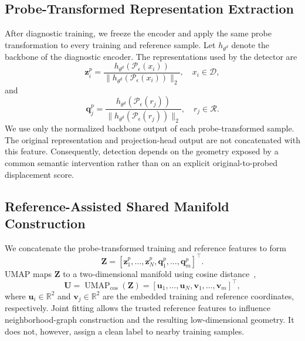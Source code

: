 \documentclass[10pt,journal]{IEEEtran}
\begin{document}
\subsection{Probe-Transformed Representation Extraction}
\label{sec:probe_feature_extraction}

After diagnostic training, we freeze the encoder and apply the same
probe transformation to every training and reference sample. Let
$h_{\theta^{d}}$ denote the backbone of the diagnostic encoder. The
representations used by the detector are
\begin{equation}
    \mathbf{z}_{i}^{p}
    =
    \frac{
        h_{\theta^{d}}(\mathcal{P}_{\epsilon}(x_i))
    }{
        \|h_{\theta^{d}}(\mathcal{P}_{\epsilon}(x_i))\|_2
    },
    \quad x_i\in\mathcal{D},
    \label{eq:training_probe_feature}
\end{equation}
and
\begin{equation}
    \mathbf{q}_{j}^{p}
    =
    \frac{
        h_{\theta^{d}}(\mathcal{P}_{\epsilon}(r_j))
    }{
        \|h_{\theta^{d}}(\mathcal{P}_{\epsilon}(r_j))\|_2
    },
    \quad r_j\in\mathcal{R}.
    \label{eq:reference_probe_feature}
\end{equation}
We use only the normalized backbone output of each probe-transformed
sample. The original representation and projection-head output are not
concatenated with this feature. Consequently, detection depends on the
geometry exposed by a common semantic intervention rather than on an
explicit original-to-probed displacement score.

\subsection{Reference-Assisted Shared Manifold Construction}
\label{sec:shared_manifold}

We concatenate the probe-transformed training and reference features
to form
\begin{equation}
    \mathbf{Z}
    =
    [\mathbf{z}_{1}^{p},\ldots,\mathbf{z}_{N}^{p},
      \mathbf{q}_{1}^{p},\ldots,\mathbf{q}_{m}^{p}]^{\top}.
    \label{eq:joint_feature_matrix}
\end{equation}
UMAP maps $\mathbf{Z}$ to a two-dimensional manifold using cosine
distance~\cite{McInnes2018UMAP},
\begin{equation}
    \mathbf{U}
    =
    \operatorname{UMAP}_{\mathrm{cos}}(\mathbf{Z})
    =
    [\mathbf{u}_{1},\ldots,\mathbf{u}_{N},
      \mathbf{v}_{1},\ldots,\mathbf{v}_{m}]^{\top},
    \label{eq:shared_umap}
\end{equation}
where $\mathbf{u}_i\in\mathbb{R}^{2}$ and
$\mathbf{v}_j\in\mathbb{R}^{2}$ are the embedded training and
reference coordinates, respectively. Joint fitting allows the trusted
reference features to influence neighborhood-graph construction and
the resulting low-dimensional geometry. It does not, however, assign
a clean label to nearby training samples.
\end{document}
